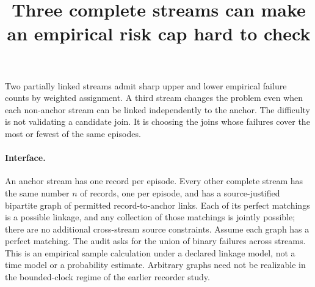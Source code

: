 \documentclass[11pt]{article}
\title{Three complete streams can make an empirical risk cap hard to check}
\begin{document}
\maketitle

Two partially linked streams admit sharp upper and lower empirical
failure counts by weighted assignment. A third stream changes the
problem even when each non-anchor stream can be linked independently
to the anchor. The difficulty is not validating a candidate join.
It is choosing the joins whose failures cover the most or fewest
of the same episodes.

\paragraph{Interface.}
An anchor stream has one record per episode. Every other complete
stream has the same number \(n\) of records, one per episode, and
has a source-justified bipartite graph of permitted record-to-anchor
links. Each of its perfect matchings is a possible linkage, and
any collection of those matchings is jointly possible; there
are no additional cross-stream source constraints. Assume each
graph has a perfect matching. The audit asks for the union of
binary failures across streams. This is an empirical sample
calculation under a declared linkage model, not a time model or
a probability estimate. Arbitrary graphs need not be realizable
in the bounded-clock regime of the earlier recorder study.
\end{document}
